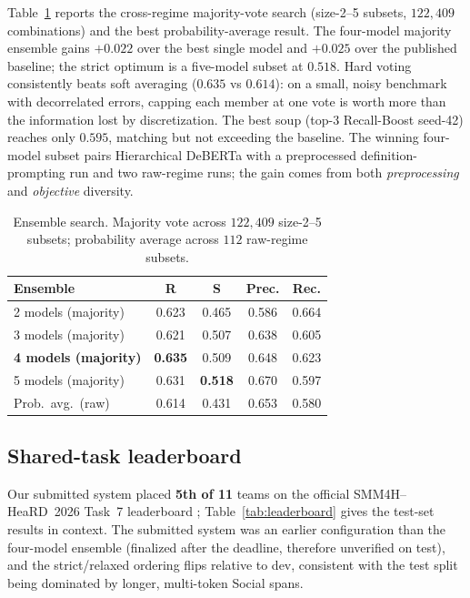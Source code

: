 \documentclass[11pt]{article}
\begin{document}
Table~\ref{tab:ensemble} reports the cross-regime majority-vote search
(size-2--5 subsets, $122{,}409$ combinations) and the best
probability-average result. The four-model majority ensemble gains
$+0.022$ over the best single model and $+0.025$ over the published
baseline; the strict optimum is a five-model subset at $0.518$. Hard
voting consistently beats soft averaging ($0.635$ vs $0.614$): on a
small, noisy benchmark with decorrelated errors, capping each member
at one vote is worth more than the information lost by discretization.
The best soup (top-3 Recall-Boost seed-42) reaches only $0.595$,
matching but not exceeding the baseline. The winning four-model subset
pairs Hierarchical DeBERTa with a preprocessed definition-prompting
run and two raw-regime runs; the gain comes from both
\emph{preprocessing} and \emph{objective} diversity.

\begin{table}[t]
\centering\small
\setlength{\tabcolsep}{4pt}
\begin{tabular}{lcccc}
\toprule
Ensemble & R & S & Prec. & Rec. \\
\midrule
2 models (majority)          & 0.623 & 0.465 & 0.586 & 0.664 \\
3 models (majority)          & 0.621 & 0.507 & 0.638 & 0.605 \\
\textbf{4 models (majority)} & \textbf{0.635} & 0.509 & 0.648 & 0.623 \\
5 models (majority)          & 0.631 & \textbf{0.518} & 0.670 & 0.597 \\
Prob.\ avg.\ (raw)           & 0.614 & 0.431 & 0.653 & 0.580 \\
\bottomrule
\end{tabular}
\caption{Ensemble search. Majority vote across $122{,}409$ size-2--5
subsets; probability average across $112$ raw-regime subsets.}
\label{tab:ensemble}
\end{table}

\subsection{Shared-task leaderboard}
\label{sec:leaderboard}

Our submitted system placed \textbf{5th of 11} teams on the official SMM4H--HeaRD~2026 Task~7 leaderboard \citep{smm4h-heard-overview-2026}; Table~\ref{tab:leaderboard} gives the test-set results in context. The submitted system was an earlier configuration than the four-model ensemble (finalized after the deadline, therefore unverified on test), and the strict/relaxed
ordering flips relative to dev, consistent with the test split being
dominated by longer, multi-token Social spans.
\end{document}
